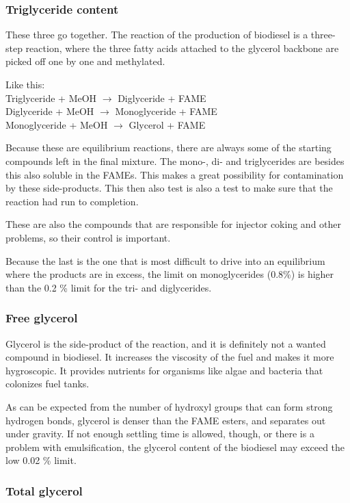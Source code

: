 \subsubsection{Triglyceride content}

These three go together. The reaction of the production of biodiesel is a three-step reaction, where the three fatty acids attached to the glycerol backbone are picked off one by one and methylated. 

Like this: 	\\Triglyceride + MeOH $\rightarrow$ Diglyceride + FAME\\
		Diglyceride + MeOH $\rightarrow$ Monoglyceride + FAME\\
		Monoglyceride + MeOH $\rightarrow$ Glycerol + FAME 
		
Because these are equilibrium reactions, there are always some of the starting compounds left in the final mixture. The mono-, di- and triglycerides are besides this also soluble in the FAMEs. This makes a great possibility for contamination by these side-products. This then also test is also a test to make sure that the reaction had run to completion.

These are also the compounds that are responsible for injector coking and other problems, so their control is important. 

Because the last is the one that is most difficult to drive into an equilibrium where the products are in excess, the limit on monoglycerides (0.8\%) is higher than the 0.2 \% limit for the tri- and diglycerides.

\subsubsection{Free glycerol}

Glycerol is the side-product of the reaction, and it is definitely not a wanted compound in biodiesel. It increases the viscosity of the fuel and makes it more hygroscopic. It provides nutrients for organisms like algae and bacteria that colonizes fuel tanks.

As can be expected from the number of hydroxyl groups that can form strong hydrogen bonds, glycerol is denser than the FAME esters, and separates out under gravity. If not enough settling time is allowed, though, or there is a problem with emulsification, the glycerol content of the biodiesel may exceed the low 0.02 \% limit.

\subsubsection{Total glycerol}

